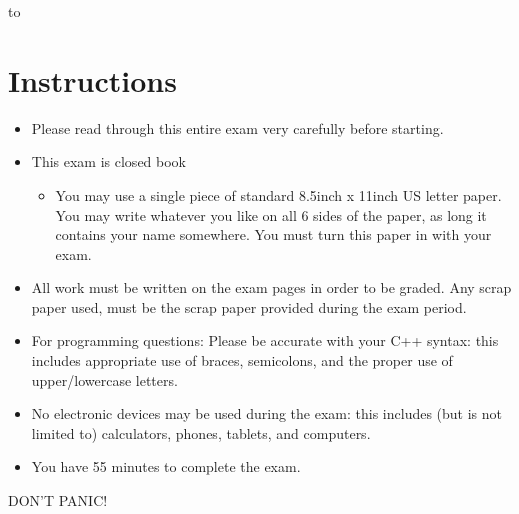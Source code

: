 \documentclass[11pt,answers]{exam}
\begin{document}
\begin{center} 
\end{center}

\lstset{language=C++,numbers=left, numberstyle=\tiny, stepnumber=1, numbersep=5pt, showstringspaces=true}

\vspace{0.1in} 
\hbox to \textwidth{Name:\enspace\hrulefill}

\section*{Instructions}
\begin{itemize}
\item Please read through this entire exam very carefully before starting. 
\item This exam is closed book
\begin{itemize}
  \item You may use a single piece of standard 8.5inch x 11inch US letter paper. You may write whatever you like on all 6 sides of the paper, as long it contains your name somewhere. You must turn this paper in with your exam.
\end{itemize}
\item All work must be written on the exam pages in order to be graded. Any scrap paper used, must be the scrap paper provided during the exam period.
\item For programming questions: Please be accurate with your C++ syntax: this includes appropriate use of braces, semicolons, and the proper use of upper/lowercase letters.  
\item No electronic devices may be used during the exam: this includes (but is not limited to) calculators, phones, tablets, and computers.
\item You have 55 minutes to complete the exam.  
\end{itemize}

\begin{center}
{\Huge DON'T PANIC!}
\end{center}
\end{document}
